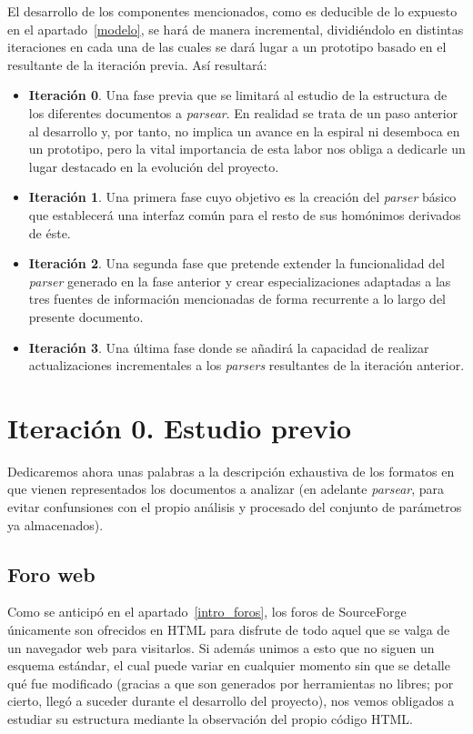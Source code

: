 El desarrollo de los componentes mencionados, como es deducible de lo
expuesto en el apartado~\ref{modelo}, se hará de manera incremental,
dividiéndolo en distintas iteraciones en cada una de las cuales se dará lugar
a un prototipo basado en el resultante de la iteración previa. Así resultará:
\begin{itemize}
\item \textbf{Iteración 0}. Una fase previa que se limitará al estudio de la
estructura de los diferentes documentos a \textit{parsear}. En realidad se
trata de un paso anterior al desarrollo y, por tanto, no implica un avance en
la espiral ni desemboca en un prototipo, pero la vital importancia de esta labor
nos obliga a dedicarle un lugar destacado en la evolución del proyecto.
\item \textbf{Iteración 1}. Una primera fase cuyo objetivo es la creación del
\textit{parser} básico que establecerá una interfaz común para el resto de
sus homónimos derivados de éste.
\item \textbf{Iteración 2}. Una segunda fase que pretende extender la funcionalidad
del \textit{parser} generado en la fase anterior y crear especializaciones
adaptadas a las tres fuentes de información mencionadas de forma recurrente
a lo largo del presente documento.
\item \textbf{Iteración 3}. Una última fase donde se añadirá la capacidad de
realizar actualizaciones incrementales a los \textit{parsers} resultantes de
la iteración anterior.
\end{itemize}



\section{Iteración 0. Estudio previo}
Dedicaremos ahora unas palabras a la descripción exhaustiva de los formatos
en que vienen representados los documentos a analizar (en adelante \textit{parsear},
para evitar confunsiones con el propio análisis y procesado del conjunto de
parámetros ya almacenados).


\subsection{Foro web}
Como se anticipó en el apartado~\ref{intro_foros}, los foros de SourceForge
únicamente son ofrecidos en HTML para disfrute de todo aquel que se valga de un
navegador web para visitarlos. Si además unimos a esto que no siguen un esquema
estándar, el cual puede variar en cualquier momento sin que se detalle qué fue
modificado (gracias a que son generados por herramientas no libres; por cierto,
llegó a suceder durante el desarrollo del proyecto), nos vemos obligados a
estudiar su estructura mediante la observación del propio código HTML.

